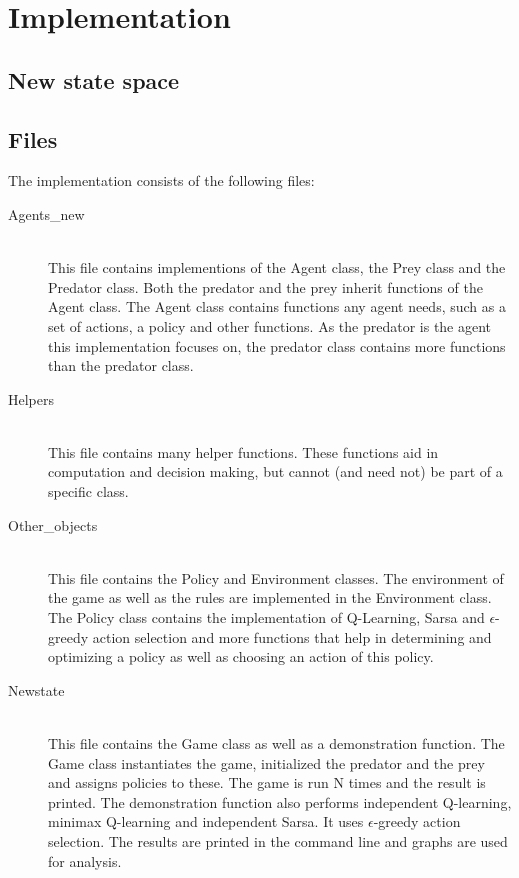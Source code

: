 \documentclass{article}
\begin{document}
%

\pagebreak

\section{Implementation}

\subsection{New state space}


\subsection{Files}

The implementation consists of the following files:
\begin{description}
	\item[Agents\_new] \hfill \\ 
	This file contains implementions of the Agent class, the Prey class and the Predator class. Both the predator and the prey inherit functions of the Agent class. The Agent class contains functions any agent needs, such as a set of actions, a policy and other functions. As the predator is the agent this implementation focuses on, the predator class contains more functions than the predator class.
	
	\item[Helpers] \hfill \\ 
	This file contains many helper functions. These functions aid in computation and decision making, but cannot (and need not) be part of a specific class.
	
	\item[Other\_objects] \hfill \\ %
	This file contains the Policy and Environment classes. The environment of the game as well as the rules are implemented in the Environment class. The Policy class contains the implementation of Q-Learning, Sarsa and $\epsilon$-greedy action selection and more functions that help in determining and optimizing a policy as well as choosing an action of this policy.
	\item[Newstate] \hfill \\ 
	This file contains the Game class as well as a demonstration function. The Game class instantiates the game, initialized the predator and the prey and assigns policies to these. The game is run N times and the result is printed. The demonstration function also performs independent Q-learning, minimax Q-learning and independent Sarsa. It uses $\epsilon$-greedy action selection. The results are printed in the command line and graphs are used for analysis.
\end{description}
\end{document}
